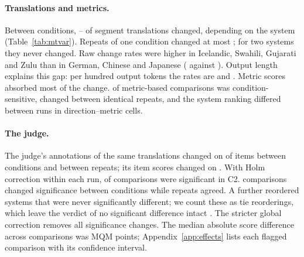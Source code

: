 \begin{table}[t]\centering\small

\caption{Serving conditions and MT evaluation records, batch-invariant mode off. Changed: mean share of segment translations (judge: annotations of the same fixed translations) that differ between runs of different conditions (between) or between the two repeats of one condition (within), averaged over directions. BI-on differing: outputs not identical across all eight runs with the mode on. BI-on time: generation time with the mode on against off in C2.}\label{tab:mtvar}
\end{table}

\paragraph{Translations and metrics.} Between conditions, \MtvBetweenMin{}--\MtvBetweenMax{} of segment translations changed, depending on the system (Table~\ref{tab:mtvar}). Repeats of one condition changed at most \MtvWithinMax{}; for two systems they never changed. Raw change rates were higher in Icelandic, Swahili, Gujarati and Zulu than in German, Chinese and Japanese (\MtvLowBetween{} against \MtvHighBetween{}). Output length explains this gap: per hundred output tokens the rates are \XLowPerTok{} and \XHighPerTok{}. Metric scores absorbed most of the change. \MtvSysCond{} of \MtvSysN{} metric-based comparisons was condition-sensitive, \MtvSysRepeat{} changed between identical repeats, and the system ranking differed between runs in \MtvRankCells{} direction--metric cells.

\paragraph{The judge.} The judge's annotations of the same translations changed on \MtvJudgeBetween{} of items between conditions and \MtvJudgeWithin{} between repeats; its item scores changed on \MtvJudgeScoreChange{}. With Holm correction within each run, \XJudgeHolmSigC{} of \MtvJudgeN{} comparisons were significant in C2. \XJudgeRobust{} comparisons changed significance between conditions while repeats agreed. A further \XJudgeTies{} reordered systems that were never significantly different; we count these as tie reorderings, which leave the verdict of no significant difference intact \citep{deutsch-etal-2023-ties}. The stricter global correction removes all significance changes. The median absolute score difference across comparisons was \XMedianDiff{} MQM points; Appendix~\ref{app:effects} lists each flagged comparison with its confidence interval.

